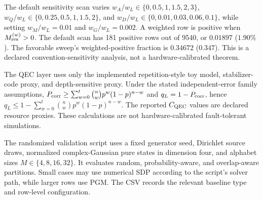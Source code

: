 The default sensitivity scan varies $w_A/w_L\in\{0,0.5,1,1.5,2,3\}$, $w_Q/w_L\in\{0,0.25,0.5,1,1.5,2\}$, and $w_D/w_L\in\{0,0.01,0.03,0.06,0.1\}$, while setting $w_M/w_L=0.01$ and $w_G/w_L=0.002$. A weighted row is positive when $M_{\rm res}^{(w)}>0$. The default scan has 181 positive rows out of 9540, or $0.01897$ ($1.90\%$). The favorable sweep's weighted-positive fraction is $0.34672$ ($0.347$). This is a declared convention-sensitivity analysis, not a hardware-calibrated theorem.

The QEC layer uses only the implemented repetition-style toy model, stabilizer-code proxy, and depth-sensitive proxy. Under the stated independent-error family assumptions, $P_{\rm corr}\ge\sum_{w=0}^t\binom nw p^w(1-p)^{n-w}$ and $q_L=1-P_{\rm corr}$, hence $q_L\le1-\sum_{w=0}^t\binom nw p^w(1-p)^{n-w}$. The reported $C_{\rm QEC}$ values are declared resource proxies. These calculations are not hardware-calibrated fault-tolerant simulations.

The randomized validation script uses a fixed generator seed, Dirichlet source draws, normalized complex-Gaussian pure states in dimension four, and alphabet sizes $M\in\{4,8,16,32\}$. It evaluates random, probability-aware, and overlap-aware partitions. Small cases may use numerical SDP according to the script's solver path, while larger rows use PGM. The CSV records the relevant baseline type and row-level configuration.

